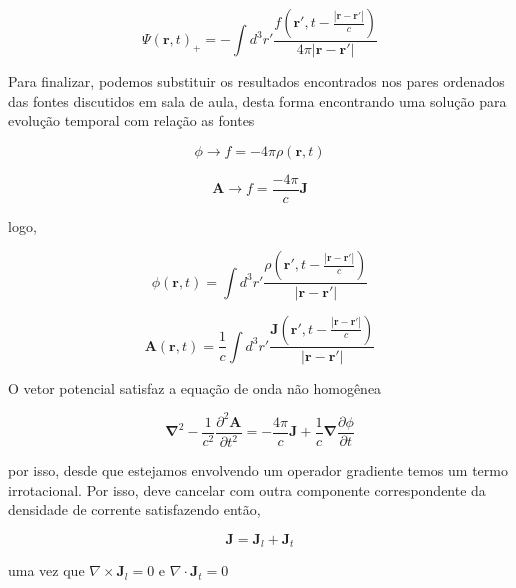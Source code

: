 \begin{equation}
	\Psi (\textbf{r}, t)_{+} = 
	-\int d^3 r'\frac{f(\textbf{r}', t -\frac{|\textbf{r}-\textbf{r}'|}{c})}{4\pi|\textbf{r}-\textbf{r}'|}
\end{equation}

Para finalizar, podemos substituir os resultados encontrados nos pares ordenados das fontes discutidos em sala de aula, desta forma encontrando uma solução para evolução temporal com relação as fontes

\begin{equation*}
	\phi \rightarrow f = -4\pi\rho(\textbf{r},t)
\end{equation*}

\begin{equation*}
	\textbf{A} \rightarrow f = \frac{-4\pi}{c}\textbf{J}
\end{equation*}

logo,

\begin{equation}
	\phi (\textbf{r}, t) = 
	\int d^3 r'\frac{\rho(\textbf{r}', t -\frac{|\textbf{r}-\textbf{r}'|}{c})}{|\textbf{r}-\textbf{r}'|}
	\label{eq2:potencialescalar}
\end{equation}

\begin{equation}
	\textbf{A} (\textbf{r}, t) = 
	\frac{1}{c}\int d^3 r'\frac{\textbf{J}(\textbf{r}', t -\frac{|\textbf{r}-\textbf{r}'|}{c})}{|\textbf{r}-\textbf{r}'|}	
\end{equation}

O vetor potencial satisfaz a equação de onda não homogênea

\begin{equation}
	\mathbf{\nabla} ^2 -\frac{1}{c^2}\frac{\partial^2\mathbf{A}}{\partial t^2} = -\frac{4\pi}{c}\textbf{J} + \frac{1}{c}\mathbf{\nabla}\frac{\partial \phi}{\partial t}
\end{equation}

por isso, desde que estejamos envolvendo um operador gradiente temos um termo irrotacional. Por isso, deve cancelar com outra componente correspondente da densidade de corrente satisfazendo então,

\begin{equation}
	\textbf{J} = \textbf{J}_l + \textbf{J}_t
\end{equation}

uma vez que $\nabla \times \textbf{J}_l = 0$ e $\nabla \cdot \textbf{J}_t = 0$





